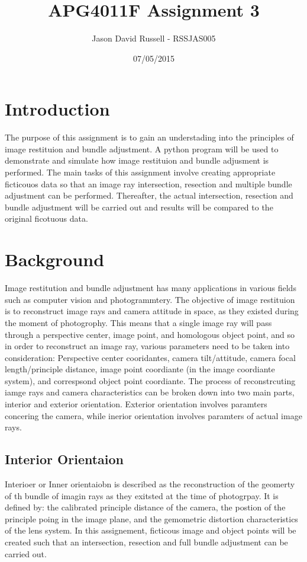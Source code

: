 \documentclass{article}
\title{APG4011F Assignment 3}
\date{07/05/2015}
\author{Jason David Russell - RSSJAS005}
\begin{document}
\maketitle
{}

\newpage
\tableofcontents


\newpage
\section{Introduction}
The purpose of this assignment is to gain an understading into the principles of image restituion and bundle adjustment.
A python program will be used to demonstrate and simulate how image restituion and bundle adjusment is performed.
The main tasks of this assignment involve creating appropriate ficticouos data so that an image ray intersection, resection
and multiple bundle adjustment can be performed. Thereafter, the actual intersection, resection and bundle adjustment will 
be carried out and results will be compared to the original ficotuous data.


\section{Background}
Image restitution and bundle adjustment has many applications in various fields such as computer vision and photogrammtery. 
The objective of image restituion is to reconstruct image rays and camera attitude in space, as they existed during the moment of photogrophy. 
This means that a single image ray will pass through a perspective center, image point, and homologous object point, and so
in order to reconstruct an image ray, various parameters need to be taken into consideration:
Perspective center cooridantes, camera tilt/attitude, camera focal length/principle distance, image point coordiante (in the 
image coordiante system), and correspsond object point coordiante.
The process of reconstrcuting iamge rays and camera characteristics can be broken down into two main parts, interior and exterior orientation.
Exterior orientation involves paramters concering the camera, while inerior orientation involves paramters of actual image rays.

\newpage

\subsection{Interior Orientaion}
Interioer or Inner orientaiobn is described as the reconstruction of the geomerty of th bundle of imagin rays as they exitsted at the time 
of photogrpay. It is defined by: the calibrated principle distance of the camera, the postion of the principle poing in the image plane, 
and the gemometric distortion characteristics of the lens system.
In this assignement, ficticous image and object points will be created such that an intersection, resection and full bundle adjustment 
can be carried out. 
\end{document}
